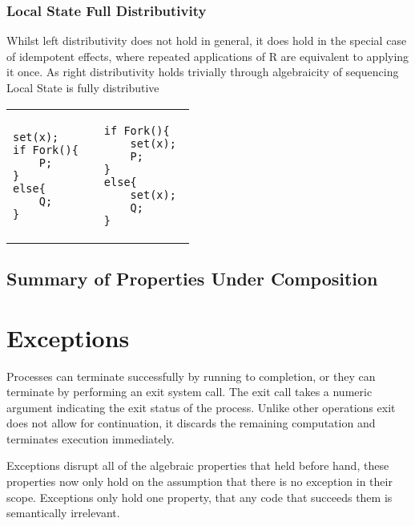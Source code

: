 \documentclass[logo,bsc,singlespacing,parskip]{infthesis}
\begin{document}
\subsubsection*{Local State Full Distributivity}
Whilst left distributivity does not hold in general, it does hold in the special case of idempotent effects, where repeated applications of R are equivalent to applying it once. As right distributivity holds trivially through algebraicity of sequencing Local State is fully distributive 

\vspace{-2em}
\begin{table}[H]
\centering
\begin{tabular}{p{} c p{}}
\begin{lstlisting}
set(x);
if Fork(){
    P;
}
else{
    Q;
}
\end{lstlisting}
&
&
\begin{lstlisting}
if Fork(){
    set(x); 
    P;
}
else{ 
    set(x); 
    Q;
}
\end{lstlisting}
\end{tabular}
\end{table}
\vspace{-2em}


\subsection{Summary of Properties Under Composition}


\section{Exceptions}
Processes can terminate successfully by running to completion, or they can terminate by performing an exit system call. The exit call takes a numeric argument indicating the exit status of the process. Unlike other operations exit does not allow for continuation, it discards the remaining computation and terminates execution immediately.

Exceptions disrupt all of the algebraic properties that held before hand, these properties now only hold on the assumption that there is no exception in their scope. Exceptions only hold one property, that any code that succeeds them is semantically irrelevant.
\end{document}
